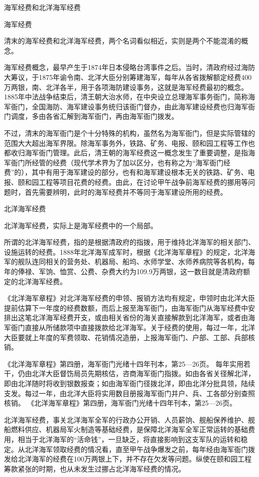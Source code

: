 \documentclass[12pt,UTF8]{ctexbook}
\begin{document}
海军经费和北洋海军经费

海军经费

清末的海军经费和北洋海军经费，两个名词看似相近，实则是两个不能混淆的概念。

海军经费概念，最早产生于1874年日本侵略台湾事件之后。当时，清政府经过海防大筹议，于1875年谕令南、北洋大臣分别筹建海军，每年从各省拨解额定经费400万两银，南、北洋各半，用于各项海防建设事务，这就是海军经费最初的概念。1885年中法战争结束后，清王朝大治水师，在中央设立总理海军事务衙门，简称海军衙门，全国海防、海军建设事务统归该衙门督办，由此海军建设经费也归海军衙门调度，多由各省汇解到海军衙门，再由海军衙门拨发。

不过，清末的海军衙门是个十分特殊的机构，虽然名为海军衙门，但是实际管辖的范围大大超出海军界限。除海军事务外，铁路、矿务、电报、颐和园工程等工作也都收归海军衙门管理。此后，清王朝的海军经费这一概念发生了重要调整，是指海军衙门所经管的经费（现代学术界为了加以区分，也有称之为“海军衙门经费”的），其中有用于海军建设的部分，也有和海军建设根本无关的铁路、矿务、电报、颐和园工程等项目花费的经费。由此，在讨论甲午战争前海军经费的挪用等问题时，首先需要辨明，此时的海军经费并不等同于海军建设所用的经费。

北洋海军经费

北洋海军经费，实际上是海军经费中的一个局部。

所谓的北洋海军经费，指的是根据清政府的指拨，用于维持北洋海军的相关部门、设施运转的经费。1888年北洋海军成军时，根据《北洋海军章程》的规定，北洋海军的舰队连同相关的营务处、机器局、船坞、水师学堂、水师养病院等各机构，每年的俸禄、军饷、恤赏、公费、杂费大约为109.9万两银，这一数目就是清政府额定的北洋海军经费。

《北洋海军章程》对北洋海军经费的申领、报销方法均有规定，申领时由北洋大臣提前估算下一年度的经费数额，而后上报至海军衙门，由海军衙门从海军经费中安排出这笔北洋海军经费开支，或由相关省份的海关直接解款到北洋海军，或者由海军衙门直接从所储款项中直接拨款给北洋海军。关于经费的使用，每过一年，北洋大臣要就上年度的军费领取、花销情况造册，上报海军衙门、户部、工部、兵部核销。

《北洋海军章程》第四册，海军衙门光绪十四年刊本，第25—26页。
每年实用若干，仍由北洋大臣督饬局员先期核估，咨商海军衙门指拨。如由各省关径解北洋，即由北洋随时将收到银数报查；如由海军衙门径拨北洋，即由北洋分批具领，陆续支发。每过一年，由北洋大臣将实用数目册报海军衙门并户、兵、工各部分别查照核销。 《北洋海军章程》第四册，海军衙门光绪十四年刊本，第25—26页。

北洋海军经费，事关北洋海军全军的行政办公开销、人员薪饷、舰船保养维护、舰船燃料供应、机器局军火制造等基础经费，是保障北洋海军全军正常运转的基础费用，相当于北洋海军的“活命钱”，一旦缺乏，将直接影响到这支军队的运转和稳定。从北洋海军领取经费的情况看，直至甲午战争爆发之前，每年经由海军衙门拨发给北洋海军的经费在100万两银上下，并不存在欠发等问题。纵使在颐和园工程筹款紧张的时期，也从未发生过挪占北洋海军经费的情况。
\end{document}
